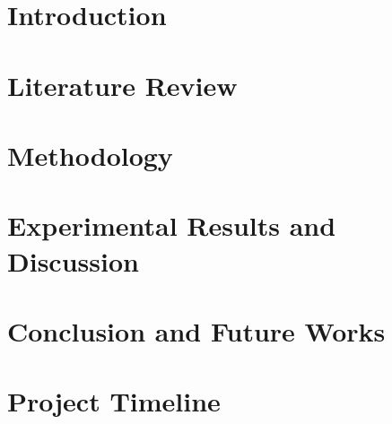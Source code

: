 \documentclass[12pt, a4paper]{report}
\begin{document}
% 



\renewcommand{\contentsname}{Table of Contents}
\tableofcontents

\clearpage 
\setcounter{figure}{0}
\listoffigures

\clearpage 
{}
\listoftables
 

\clearpage




\chapter{Introduction} \label{ch: intro}
\setcounter{page}{0}


\chapter{Literature Review} \label{ch: reviews}


\chapter{Methodology}  \label{ch: methodology}


\chapter{Experimental Results and Discussion}  \label{ch: results}


\chapter{Conclusion and Future Works}  \label{ch: conclusion}


\chapter{Project Timeline}  \label{ch: timeline}


\clearpage
\renewcommand\bibname{References}
% 

\nocite{*}
\end{document}
